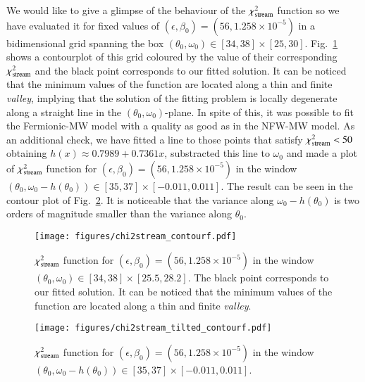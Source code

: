 \documentclass[twocolumn]{aa}
\begin{document}
%
We would like to give a glimpse of the behaviour of the $\chi^2_{\rm{stream}}$ function so we have evaluated it for fixed values of $(\epsilon, \beta_0)=(56, 1.258\times10^{-5})$ in a bidimensional grid
spanning the box $(\theta_0, \omega_0)\in[34, 38]\times[25, 30]$.
Fig.~\ref{fig:chi2stream} shows a contourplot of this grid coloured by the value of their corresponding $\chi^2_{\rm{stream}}$ and the black point corresponds to our fitted solution.
It can be noticed that the minimum values of the function are located along a thin and finite {\it valley}, implying that the solution of the fitting problem is locally degenerate along
a straight line in the $(\theta_0, \omega_0)$-plane. In spite of this, it was possible
to fit the Fermionic-MW model with a quality as good as in the NFW-MW model.
As an additional check, we have fitted a line to those points that satisfy $\chi^2_{\rm{stream}}<50$
obtaining $h(x)\approx 0.7989+0.7361x$, substracted this line to $\omega_0$ and made a plot of $\chi^2_{\rm{stream}}$ function for $(\epsilon, \beta_0)=(56, 1.258\times10^{-5})$ in the window $(\theta_0, \omega_0-h(\theta_0))\in[35, 37]\times[-0.011,0.011]$. The result can be seen in the contour plot of
Fig.~\ref{fig:chi2stream_tilted}. It is noticeable that the variance along $\omega_0-h(\theta_0)$ is two orders of magnitude smaller than the variance along $\theta_0$.
%
\begin{figure}
   \centering
   \texttt{[image: figures/chi2stream\_contourf.pdf]}
   \caption{$\chi^2_{\rm{stream}}$ function for $(\epsilon, \beta_0)=(56, 1.258\times10^{-5})$ in
   the window $(\theta_0, \omega_0)\in[34, 38]\times[25.5,28.2]$. The black point corresponds to our fitted solution. It can be noticed that    the minimum values of the function are located along a thin and finite {\it valley}.}
   \label{fig:chi2stream}
\end{figure}
\begin{figure}
   \centering
   \texttt{[image: figures/chi2stream\_tilted\_contourf.pdf]}
   \caption{$\chi^2_{\rm{stream}}$ function for $(\epsilon, \beta_0)=(56, 1.258\times10^{-5})$ in
   the window $(\theta_0, \omega_0-h(\theta_0))\in[35, 37]\times[-0.011,0.011]$. }
   \label{fig:chi2stream_tilted}
\end{figure}
\end{document}
